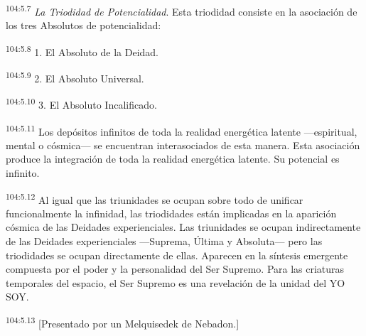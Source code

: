 \par
\textsuperscript{104:5.7} \textit{La Triodidad de Potencialidad}. Esta triodidad consiste en la asociación de los tres Absolutos de potencialidad:

\par
\textsuperscript{104:5.8} 1. El Absoluto de la Deidad.

\par
\textsuperscript{104:5.9} 2. El Absoluto Universal.

\par
\textsuperscript{104:5.10} 3. El Absoluto Incalificado.

\par
\textsuperscript{104:5.11} Los depósitos infinitos de toda la realidad energética latente ---espiritual, mental o cósmica--- se encuentran interasociados de esta manera. Esta asociación produce la integración de toda la realidad energética latente. Su potencial es infinito.

\par
\textsuperscript{104:5.12} Al igual que las triunidades se ocupan sobre todo de unificar funcionalmente la infinidad, las triodidades están implicadas en la aparición cósmica de las Deidades experienciales. Las triunidades se ocupan indirectamente de las Deidades experienciales ---Suprema, Última y Absoluta--- pero las triodidades se ocupan directamente de ellas. Aparecen en la síntesis emergente compuesta por el poder y la personalidad del Ser Supremo. Para las criaturas temporales del espacio, el Ser Supremo es una revelación de la unidad del YO SOY.

\par
\textsuperscript{104:5.13} [Presentado por un Melquisedek de Nebadon.]